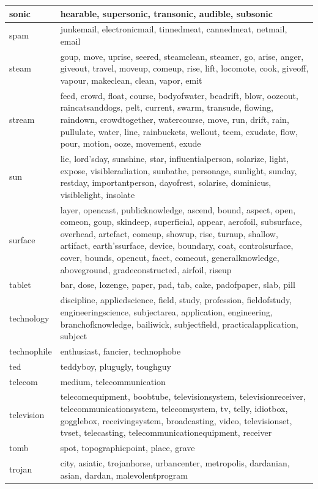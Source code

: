 \documentclass[12pt,a4paper]{report}
\begin{document}
\begin{table}[H]
\begin{center}
\begin{tabular}{|l|l|}
\hline
sonic & hearable, supersonic, transonic, audible, subsonic\\
\hline
spam & junkemail, electronicmail, tinnedmeat, cannedmeat, netmail, email\\
\hline
steam & goup, move, uprise, seered, steamclean, steamer, go, arise, anger, giveout, travel, moveup, comeup, rise, lift, locomote, cook, giveoff, vapour, makeclean, clean, vapor, emit\\
\hline
stream & feed, crowd, float, course, bodyofwater, beadrift, blow, oozeout, raincatsanddogs, pelt, current, swarm, transude, flowing, raindown, crowdtogether, watercourse, move, run, drift, rain, pullulate, water, line, rainbuckets, wellout, teem, exudate, flow, pour, motion, ooze, movement, exude\\
\hline
sun & lie, lord'sday, sunshine, star, influentialperson, solarize, light, expose, visibleradiation, sunbathe, personage, sunlight, sunday, restday, importantperson, dayofrest, solarise, dominicus, visiblelight, insolate\\
\hline
surface & layer, opencast, publicknowledge, ascend, bound, aspect, open, comeon, goup, skindeep, superficial, appear, aerofoil, subsurface, overhead, artefact, comeup, showup, rise, turnup, shallow, artifact, earth'ssurface, device, boundary, coat, controlsurface, cover, bounds, opencut, facet, comeout, generalknowledge, aboveground, gradeconstructed, airfoil, riseup\\
\hline
tablet & bar, dose, lozenge, paper, pad, tab, cake, padofpaper, slab, pill\\
\hline
technology & discipline, appliedscience, field, study, profession, fieldofstudy, engineeringscience, subjectarea, application, engineering, branchofknowledge, bailiwick, subjectfield, practicalapplication, subject\\
\hline
technophile & enthusiast, fancier, technophobe\\
\hline
ted & teddyboy, plugugly, toughguy\\
\hline
telecom & medium, telecommunication\\
\hline
television & telecomequipment, boobtube, televisionsystem, televisionreceiver, telecommunicationsystem, telecomsystem, tv, telly, idiotbox, gogglebox, receivingsystem, broadcasting, video, televisionset, tvset, telecasting, telecommunicationequipment, receiver\\
\hline
tomb & spot, topographicpoint, place, grave\\
\hline
trojan & city, asiatic, trojanhorse, urbancenter, metropolis, dardanian, asian, dardan, malevolentprogram\\

\end{tabular}
\end{center}
\end{table}
\end{document}
